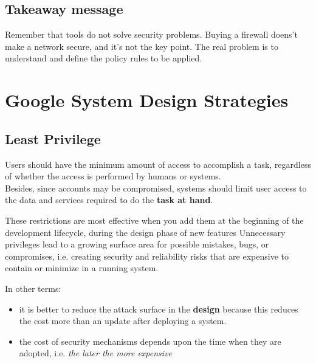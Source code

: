 \subsection{Takeaway message}
Remember that tools do not solve security problems.
Buying a firewall doens't make a network secure, and it's not the key point.
The real problem is to understand and define the policy rules to be applied.

\section{Google System Design Strategies}

\subsection{Least Privilege}
Users should have the minimum amount of access to accomplish a task,
regardless of whether the access is performed by humans or systems.\\
Besides, since accounts may be compromised, systems should limit user access to the data and services required to do the \textbf{task at hand}.

These restrictions are most effective when you add them at the beginning of the development lifecycle,
during the design phase of new features
Unnecessary privileges lead to a growing surface area for possible mistakes, bugs, or compromises, i.e. creating security and reliability risks that are expensive to contain or minimize in a running system.

In other terms:
\begin{itemize}
   \item it is better to reduce the attack surface in the \textbf{design} because this
   reduces the cost more than an update after deploying a system.
   \item the cost of security mechanisms depends upon the time when they
   are adopted, i.e. \textit{the later the more expensive}
\end{itemize}



